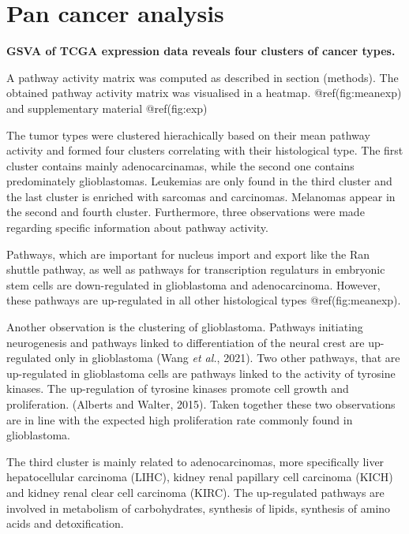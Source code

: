 \documentclass[
  parskip,
  oneside]{scrreprt}
\begin{document}
\hypertarget{pan-cancer-analysis}{%
\section{Pan cancer analysis}\label{pan-cancer-analysis}}

\textbf{GSVA of TCGA expression data reveals four clusters of cancer
types.}

A pathway activity matrix was computed as described in section
(methods). The obtained pathway activity matrix was visualised in a
heatmap. @ref(fig:meanexp) and supplementary material @ref(fig:exp)

The tumor types were clustered hierachically based on their mean pathway
activity and formed four clusters correlating with their histological
type. The first cluster contains mainly adenocarcinamas, while the
second one contains predominately glioblastomas. Leukemias are only
found in the third cluster and the last cluster is enriched with
sarcomas and carcinomas. Melanomas appear in the second and fourth
cluster. Furthermore, three observations were made regarding specific
information about pathway activity.

Pathways, which are important for nucleus import and export like the Ran
shuttle pathway, as well as pathways for transcription regulaturs in
embryonic stem cells are down-regulated in glioblastoma and
adenocarcinoma. However, these pathways are up-regulated in all other
histological types @ref(fig:meanexp).

Another observation is the clustering of glioblastoma. Pathways
initiating neurogenesis and pathways linked to differentiation of the
neural crest are up-regulated only in glioblastoma (Wang \emph{et al.},
2021). Two other pathways, that are up-regulated in glioblastoma cells
are pathways linked to the activity of tyrosine kinases. The
up-regulation of tyrosine kinases promote cell growth and proliferation.
(Alberts and Walter, 2015). Taken together these two observations are in
line with the expected high proliferation rate commonly found in
glioblastoma.

The third cluster is mainly related to adenocarcinomas, more
specifically liver hepatocellular carcinoma (LIHC), kidney renal
papillary cell carcinoma (KICH) and kidney renal clear cell carcinoma
(KIRC). The up-regulated pathways are involved in metabolism of
carbohydrates, synthesis of lipids, synthesis of amino acids and
detoxification.
\end{document}
